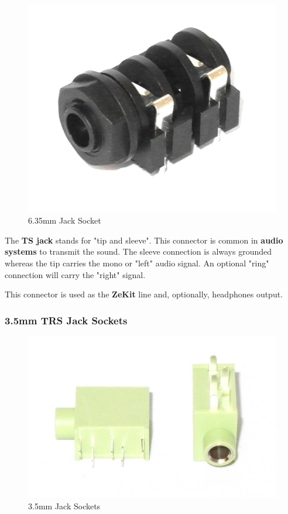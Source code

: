 \documentclass{scrartcl}
\begin{document}
\begin{figure}[!ht]
    \begin{center}
        \includegraphics[scale=0.20]{assets/zekit-jack.jpg}
        \caption{6.35mm Jack Socket}
    \end{center}
\end{figure}

The \textbf{TS jack} stands for "tip and sleeve". This connector is common in \textbf{audio systems} to transmit the sound. The sleeve connection is always grounded whereas the tip carries the mono or "left" audio signal. An optional "ring" connection will carry the "right" signal.

This connector is used as the \textbf{ZeKit} line and, optionally, headphones output.

\pagebreak
\subsubsection{3.5mm TRS Jack Sockets}

\begin{figure}[!ht]
    \begin{center}
        \includegraphics[scale=0.15]{assets/zekit-minijack.jpg}
        \caption{3.5mm Jack Sockets}
    \end{center}
\end{figure}
\end{document}
